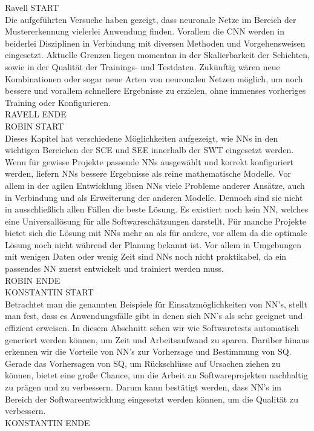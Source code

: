 Ravell START\\
Die aufgeführten Versuche haben gezeigt, dass neuronale Netze im Bereich der Mustererkennung vielerlei Anwendung finden. Vorallem die CNN werden in beiderlei Disziplinen in Verbindung mit diversen Methoden und Vorgehensweisen eingesetzt. Aktuelle Grenzen liegen momentan in der Skalierbarkeit der Schichten, sowie in der Qualität der Trainings- und Testdaten. Zukünftig wären neue Kombinationen oder sogar neue Arten von neuronalen Netzen möglich, um noch bessere und vorallem schnellere Ergebnisse zu erzielen, ohne immenses vorheriges Training oder Konfigurieren.\\
RAVELL ENDE\\
ROBIN START\\
Dieses Kapitel hat verschiedene Möglichkeiten aufgezeigt, wie NNs in den wichtigen Bereichen der SCE und SEE innerhalb der SWT eingesetzt werden. Wenn für gewisse Projekte passende NNs ausgewählt und korrekt konfiguriert werden, liefern NNs bessere Ergebnisse als reine mathematische Modelle. Vor allem in der agilen Entwicklung lösen NNs viele Probleme anderer Ansätze, auch in Verbindung und als Erweiterung der anderen Modelle.
Dennoch sind sie nicht in ausschließlich allen Fällen die beste Lösung. Es existiert noch kein NN, welches eine Universallösung für alle Softwareschätzungen darstellt. Für manche Projekte bietet sich die Lösung mit NNs mehr an als für andere, vor allem da die optimale Lösung noch nicht während der Planung bekannt ist. Vor allem in Umgebungen mit wenigen Daten oder wenig Zeit sind NNs noch nicht praktikabel, da ein passendes NN zuerst entwickelt und trainiert werden muss.\\
ROBIN ENDE\\
KONSTANTIN START\\
Betrachtet man die genannten Beispiele für Einsatzmöglichkeiten von NN's, stellt man fest, dass es Anwendungsfälle gibt in denen sich NN's als sehr geeignet und effizient erweisen. In diesem Abschnitt sehen wir wie Softwaretests automatisch generiert werden können, um Zeit und Arbeitsaufwand zu sparen. Darüber hinaus erkennen wir die Vorteile von NN's zur Vorhersage und Bestimmung von SQ. Gerade das Vorhersagen von SQ, um Rückschlüsse auf Ursachen ziehen zu können, bietet eine große Chance, um die Arbeit an Softwareprojekten nachhaltig zu prägen und zu verbessern. Darum kann bestätigt werden, dass NN's im Bereich der Softwareentwicklung eingesetzt werden können, um die Qualität zu verbessern.\\
KONSTANTIN ENDE\\
